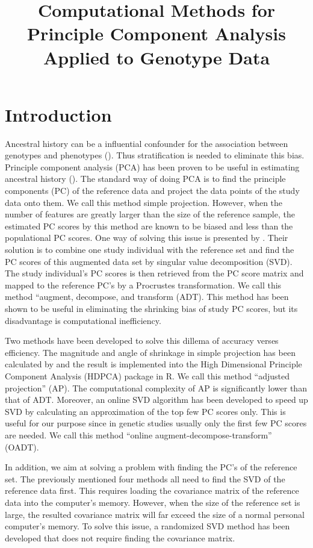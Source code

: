 \documentclass{article}
\title{Computational Methods for Principle Component Analysis Applied to
  Genotype Data}
\date{}
\begin{document}
\maketitle

\section{Introduction}

Ancestral history can be a influential confounder for the association between
genotypes and phenotypes (\cite{price}).
Thus stratification is needed to eliminate this bias.
Principle component analysis (PCA) has been proven to be useful in estimating
ancestral history (\cite{reich}).
The standard way of doing PCA is to find the principle components (PC) of the
reference data and project the data points of the study data onto them.
We call this method simple projection.
However, when the number of features are greatly larger than the size of the
reference sample,
the estimated PC scores by this method are known to be biased and less
than the populational PC scores.
One way of solving this issue is presented by \cite{wang}.
Their solution is to combine one study individual with the reference set and
find the PC scores of this augmented data set by singular value decomposition (SVD).
The study individual's PC scores is then retrieved from the PC score matrix and
mapped to the reference PC's by a Procrustes transformation.
We call this method ``augment, decompose, and transform (ADT).
This method has been shown to be useful in eliminating the shrinking bias of
study PC scores, but its disadvantage is computational inefficiency.

Two methods have been developed to solve this dillema of accuracy verses efficiency.
The magnitude and angle of shrinkage in simple projection has been calculated by
\cite{dey} and the result is implemented into the High Dimensional Principle
Component Analysis (HDPCA) package in R.
We call this method ``adjusted projection'' (AP).
The computational complexity of AP is significantly lower than that of ADT.
Moreover, an online SVD algorithm has been developed to speed up SVD by calculating an approximation of the top few PC scores only.
This is useful for our purpose since in genetic studies usually only the first few PC scores are needed. 
We call this method ``online augment-decompose-transform'' (OADT). 

In addition, we aim at solving a problem with finding the PC's of the reference set.
The previously mentioned four methods all need to find the SVD of the reference data first.
This requires loading the covariance matrix of the reference data into the
computer's memory. 
However, when the size of the reference set is large,
the resulted covariance matrix will far exceed the size of a normal personal
computer's memory.
To solve this issue, a randomized SVD method has been developed that does not
require finding the covariance matrix.
\end{document}

